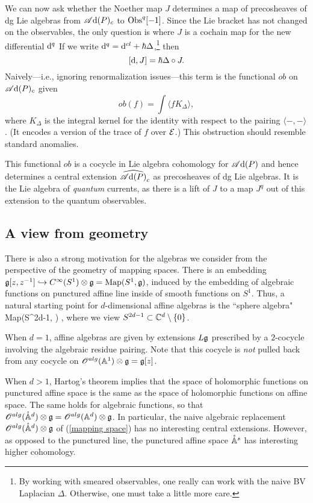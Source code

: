 We can now ask whether the Noether map $J$ determines a map of precosheaves of dg Lie algebras from $\mathscr A{\rm d}(P)_c$ to ${\rm Obs}^q[-1]$.
Since the Lie bracket has not changed on the observables, 
the only question is where $J$ is a cochain map for the new differential ${\rm d}^q$
If we write ${\rm d}^q = {\rm d}^{cl} + \hbar \Delta$,\footnote{By working with smeared observables, one really can work with the naive BV Laplacian $\Delta$. Otherwise, one must take a little more care.} then 
\[
[{\rm d},J] = \hbar \Delta \circ J.
\]
Naively---i.e., ignoring renormalization issues---this term is the functional $ob$ on $\mathscr A{\rm d}(P)_c$ given 
\[
ob(f) = \int \langle f K_\Delta \rangle,
\]
where $K_\Delta$ is the integral kernel for the identity with respect to the pairing $\langle-,-\rangle$.
(It encodes a version of the trace of $f$ over $\mathcal E$.)
This obstruction should resemble standard anomalies.

This functional $ob$ is a cocycle in Lie algebra cohomology for $\mathscr A{\rm d}(P)$ and hence determines a central extension $\widehat{\mathscr A{\rm d}(P)}_c$ as precosheaves of dg Lie algebras.
It is the Lie algebra of {\em quantum} currents, as there is a lift of $J$ to a map $J^q$ out of this extension to the quantum observables.

\subsection*{A view from geometry}

There is also a strong motivation for the algebras we consider from the perspective of the geometry of mapping spaces. 
There is an embedding $\mathfrak g[z,z^{-1}] \hookrightarrow C^\infty(S^1) \otimes \mathfrak g = {\rm Map}(S^1, \mathfrak g)$, induced by the embedding of algebraic functions on punctured affine line inside of smooth functions on $S^1$. 
Thus, a natural starting point for $d$-dimensional affine algebras is the ``sphere algebra" 
\beqn\label{mapping space}
{\rm Map}(S^{2d-1}, \fg) ,
\eeqn
where we view $S^{2d-1} \subset \mathbb C^d \setminus \{0\}$. 

When $d=1$, affine algebras are given by extensions $L\mathfrak g$ prescribed by a $2$-cocycle involving the algebraic residue pairing. 
Note that this cocycle is {\em not} pulled back from any cocycle on $\mathscr O^{alg}(\mathbb A^1) \otimes \mathfrak g = \mathfrak g[z]$. 

When $d > 1$, Hartog's theorem implies that the space of holomorphic functions on punctured affine space is the same as the space of holomorphic functions on affine space.
The same holds for algebraic functions, so that $\mathscr O^{alg}(\mathring{\mathbb A}^{d}) \otimes \mathfrak g = \mathscr O^{alg}(\mathbb A^d) \otimes \mathfrak g$. 
In particular, the naive algebraic replacement $\mathscr O^{alg}(\mathring{\mathbb A}^{d}) \otimes \mathfrak g$ of (\ref{mapping space}) has no interesting central extensions. 
However, as opposed to the punctured line, the punctured affine space $\mathring{\mathbb A}^{s}$ has interesting higher cohomology. 

